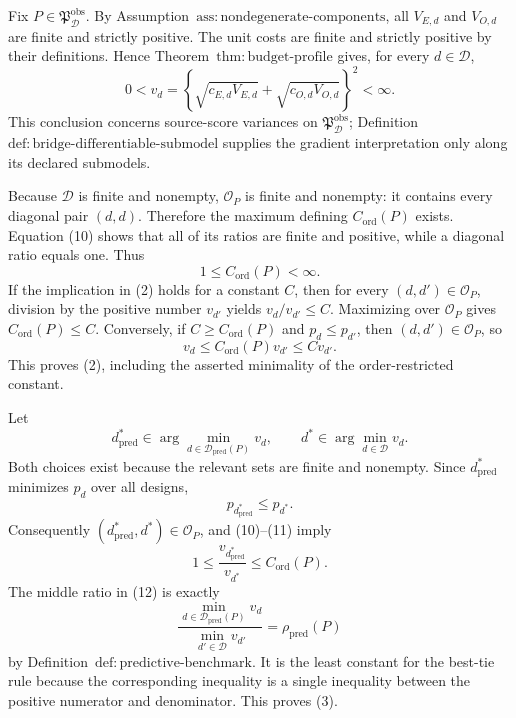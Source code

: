 Fix \(P\in\mathfrak P_{\mathcal D}^{\mathrm{obs}}\).  By Assumption~\(\mathrm{ass{:}nondegenerate\text{-}components}\), all \(V_{E,d}\) and \(V_{O,d}\) are finite and strictly positive.  The unit costs are finite and strictly positive by their definitions.  Hence Theorem~\(\mathrm{thm{:}budget\text{-}profile}\) gives, for every \(d\in\mathcal D\),
\[
 0<v_d
 =\left\{\sqrt{c_{E,d}V_{E,d}}+\sqrt{c_{O,d}V_{O,d}}\right\}^{2}
 <\infty.                                                     \tag{10}
\]
This conclusion concerns source-score variances on \(\mathfrak P_{\mathcal D}^{\mathrm{obs}}\); Definition~\(\mathrm{def{:}bridge\text{-}differentiable\text{-}submodel}\) supplies the gradient interpretation only along its declared submodels.

Because \(\mathcal D\) is finite and nonempty, \(\mathcal O_P\) is finite and nonempty: it contains every diagonal pair \((d,d)\).  Therefore the maximum defining \(C_{\mathrm{ord}}(P)\) exists.  Equation (10) shows that all of its ratios are finite and positive, while a diagonal ratio equals one.  Thus
\[
 1\le C_{\mathrm{ord}}(P)<\infty.                            \tag{11}
\]
If the implication in (2) holds for a constant \(C\), then for every \((d,d')\in\mathcal O_P\), division by the positive number \(v_{d'}\) yields \(v_d/v_{d'}\le C\).  Maximizing over \(\mathcal O_P\) gives \(C_{\mathrm{ord}}(P)\le C\).  Conversely, if \(C\ge C_{\mathrm{ord}}(P)\) and \(p_d\le p_{d'}\), then \((d,d')\in\mathcal O_P\), so
\[
 v_d\le C_{\mathrm{ord}}(P)v_{d'}\le Cv_{d'}.
\]
This proves (2), including the asserted minimality of the order-restricted constant.

Let
\[
 d_{\mathrm{pred}}^*\in
 \arg\min_{d\in\mathcal D_{\mathrm{pred}}(P)}v_d,
 \qquad
 d^*\in\arg\min_{d\in\mathcal D}v_d.
\]
Both choices exist because the relevant sets are finite and nonempty.  Since \(d_{\mathrm{pred}}^*\) minimizes \(p_d\) over all designs,
\[
 p_{d_{\mathrm{pred}}^*}\le p_{d^*}.
\]
Consequently \((d_{\mathrm{pred}}^*,d^*)\in\mathcal O_P\), and (10)--(11) imply
\[
 1
 \le \frac{v_{d_{\mathrm{pred}}^*}}{v_{d^*}}
 \le C_{\mathrm{ord}}(P).                                   \tag{12}
\]
The middle ratio in (12) is exactly
\[
 \frac{\min_{d\in\mathcal D_{\mathrm{pred}}(P)}v_d}
      {\min_{d'\in\mathcal D}v_{d'}}
 =\rho_{\mathrm{pred}}(P)
\]
by Definition~\(\mathrm{def{:}predictive\text{-}benchmark}\).  It is the least constant for the best-tie rule because the corresponding inequality is a single inequality between the positive numerator and denominator.  This proves (3).

